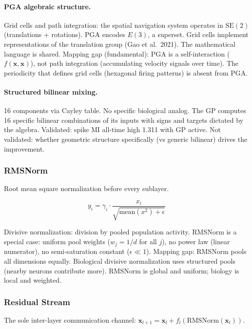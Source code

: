 \documentclass[11pt,a4paper]{article}
\begin{document}
\paragraph{PGA algebraic structure.}
Grid cells and path integration: the spatial navigation system operates in $\mathrm{SE}(2)$ (translations + rotations). PGA encodes $E(3)$, a superset. Grid cells implement representations of the translation group (Gao et al.\ 2021). The mathematical language is shared. Mapping gap (fundamental): PGA is a self-interaction ($f(\mathbf{x}, \mathbf{x})$), not path integration (accumulating velocity signals over time). The periodicity that defines grid cells (hexagonal firing patterns) is absent from PGA.

\paragraph{Structured bilinear mixing.}
16 components via Cayley table. No specific biological analog. The GP computes 16 specific bilinear combinations of its inputs with signs and targets dictated by the algebra. Validated: spike MI all-time high 1.311 with GP active. Not validated: whether geometric structure specifically (vs generic bilinear) drives the improvement.

\subsubsection{RMSNorm}

Root mean square normalization before every sublayer.

\[
  y_i = \gamma_i \cdot \frac{x_i}{\sqrt{\mathrm{mean}(x^2) + \epsilon}}
\]

Divisive normalization: division by pooled population activity. RMSNorm is a special case: uniform pool weights ($w_j = 1/d$ for all $j$), no power law (linear numerator), no semi-saturation constant ($\epsilon \ll 1$). Mapping gap: RMSNorm pools all dimensions equally. Biological divisive normalization uses structured pools (nearby neurons contribute more). RMSNorm is global and uniform; biology is local and weighted.

\subsubsection{Residual Stream}

The sole inter-layer communication channel: $\mathbf{x}_{l+1} = \mathbf{x}_l + f_l(\mathrm{RMSNorm}(\mathbf{x}_l))$.
\end{document}
